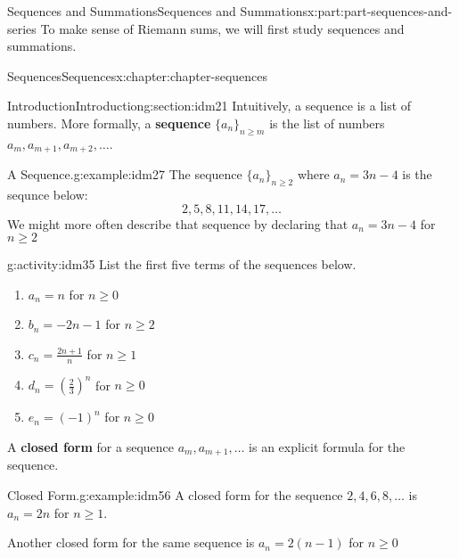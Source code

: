 \documentclass[oneside,10pt,]{book}
\newcommand{\terminology}[1]{\textbf{#1}}
\begin{document}
\begin{partptx}{Sequences and Summations}{}{Sequences and Summations}{}{}{x:part:part-sequences-and-series}
 To make sense of Riemann sums, we will first study sequences and summations. %
%
\typeout{************************************************}
\typeout{************************************************}
%
\begin{chapterptx}{Sequences}{}{Sequences}{}{}{x:chapter:chapter-sequences}
%
%
\typeout{************************************************}
\typeout{************************************************}
%
\begin{sectionptx}{Introduction}{}{Introduction}{}{}{g:section:idm21}
Intuitively, a sequence is a list of numbers. More formally, a \terminology{sequence} \(\{a_n\}_{n \geq m}\) is the list of numbers \(a_m, a_{m+1}, a_{m+2}, \dots\).%
\begin{example}{A Sequence.}{g:example:idm27}%
The sequence \(\{a_n\}_{n \geq 2}\) where \(a_n = 3n-4\) is the sequnce below:%
\begin{equation*}
2, 5, 8, 11, 14, 17, \dots
\end{equation*}
We might more often describe that sequence by declaring that \(a_n = 3n-4\) for \(n \geq 2\)%
\end{example}
\begin{activity}{}{g:activity:idm35}%
List the first five terms of the sequences below.%
\begin{enumerate}[font=\bfseries,label=(\alph*),ref=\alph*]
\item{}\(a_n = n\) for \(n \geq 0\)\item{}\(b_n = -2n-1\) for \(n \geq 2\)\item{}\(c_n = \frac{2n+1}{n}\) for \(n \geq 1\)\item{}\(d_n = \left(\frac{2}{3}\right)^n\) for \(n \geq 0\)\item{}\(e_n = (-1)^n\) for \(n \geq 0\)\end{enumerate}
\end{activity}
A \terminology{closed form} for a sequence \(a_m, a_{m+1}, \dots\) is an explicit formula for the sequence.%
\begin{example}{Closed Form.}{g:example:idm56}%
A closed form for the sequence \(2, 4, 6, 8, \dots\) is \(a_n = 2n\) for \(n \geq 1\).%
\par
Another closed form for the same sequence is \(a_n = 2(n-1)\) for \(n \geq 0\)%
\end{example}

\end{sectionptx}
\end{chapterptx}
\end{partptx}
\end{document}
